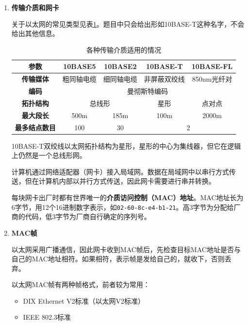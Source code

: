 \documentclass[12pt, a4paper, oneside]{ctexart}
\begin{document}
\begin{enumerate}
    \item {\bf 传输介质和网卡}
    
    关于以太网的常见类型见表\ref{ethernet}。题目中只会给出形如10BASE-T这种名字，不会给出其他信息。

    \begin{table}
        \centering
        \caption{各种传输介质适用的情况}
        \label{ethernet}
        \begin{tabular}{|c|c|c|c|c|}
            \hline
            \textbf{参数} & \textbf{10BASE5} & \textbf{10BASE2} & \textbf{10BASE-T} & \textbf{10BASE-FL} \\
            \hline
            \textbf{传输媒体} & 粗同轴电缆 & 细同轴电缆 & 非屏蔽双绞线 & 850nm光纤对 \\
            \hline
            \textbf{编码} & \multicolumn{4}{|c|}{曼彻斯特编码} \\
            \hline
            \textbf{拓扑结构} & \multicolumn{2}{|c|}{总线形} & 星形 & 点对点 \\
            \hline
            \textbf{最大段长} & 500m & 185m & 100m & 2000m \\
            \hline
            \textbf{最多结点数目} & 100 & 30 & \multicolumn{2}{|c|}{2} \\
            \hline
        \end{tabular}
    \end{table}

    10BASE-T双绞线以太网拓扑结构为星形，星形的中心为集线器，但它在逻辑上仍然是一个总线形网。

    计算机通过网络适配器（网卡）接入局域网。数据在局域网中以串行方式传送，但在计算机内部以并行方式传送，因此网卡需要进行串并转换。

    每块网卡出厂时都有世界唯一的\textbf{介质访问控制（MAC）地址}。MAC地址长为6字节，用12个16进制数字表示，如\verb|02-60-8c-e4-b1-21|。高3字节为分配给厂商的代码，低3字节为厂商自行确定的序列号。

    \item {\bf MAC帧}
    
    以太网采用广播通信，因此网卡收到MAC帧后，先检查目标MAC地址是否与自己的MAC地址相符。如果相符，表示帧是发给自己的，就收下，否则丢弃。

    以太网MAC帧有两种帧格式，前者较为常用：
    \begin{itemize}
        \item DIX Ethernet V2标准（以太网V2标准）
        \item IEEE 802.3标准
    \end{itemize}


\end{enumerate}
\end{document}
